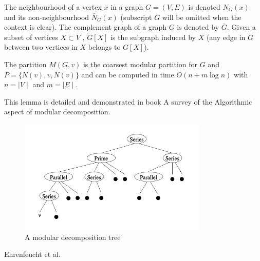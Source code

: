 The neighbourhood of a vertex $x$ in a graph $G = (V, E)$ is denoted $N_G(x)$ and its non-neighbourhood $\bar{N}_G(x)$ (subscript $G$ will be omitted when the context is clear).
The complement graph of a graph $G$ is denoted by $\bar{G}$.
Given a subset of vertices $X \subset V$ , $G[X]$ is the subgraph induced by $X$ (any edge in $G$ between two vertices in $X$ belongs to $G[X]$).

\begin{mylem}
    The partition $M(G, v)$ is the coarsest modular partition for $G$ and $P = \{N(v), v, \bar{N}(v)\}$ and can be computed in time $O(n + m \log n)$ with $n = \mid V \mid$ and $m = \mid E \mid$.
\end{mylem}

This lemma is detailed and demonstrated in book A survey of the Algorithmic aspect of modular decomposition\cite{SAMD}.

\begin{figure}[!h]
    \centering
    \includegraphics[width=0.80\textwidth]{images/graphs/modular-decomposition-tree}
    \caption{A modular decomposition tree}
    \label{fig:example-modular-decomposition-tree}
\end{figure}

\begin{algorithm}[H]
    \caption{Ehrenfeucht et al. \cite{SAMD}\cite{PTDMD}} %
    \label{alg:algorithm-Ehrenfeucht-et-al}
\end{algorithm}


